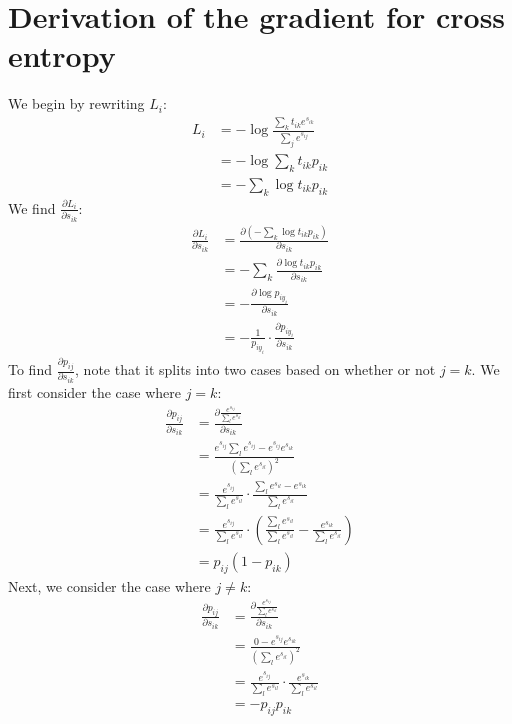 \documentclass[11pt]{article}
\begin{document}


\section*{Derivation of the gradient for cross entropy}
We begin by rewriting $L_i$:
\begin{align*}
	L_i&=-\log\frac{\sum_kt_{ik}e^{s_{ik}}}{\sum_je^{s_{ij}}}\\
	   &=-\log\sum_kt_{ik}p_{ik}\\
	   &=-\sum_k\log t_{ik}p_{ik}
\end{align*}
We find $\frac{\partial L_i}{\partial s_{ik}}$:
\begin{align*}
	\frac{\partial L_i}{\partial s_{ik}}
	&=\frac{\partial(-\sum_k\log t_{ik}p_{ik})}{\partial s_{ik}}\\
	&=-\sum_k\frac{\partial\log t_{ik}p_{ik}}{\partial s_{ik}}\\
	&=-\frac{\partial \log{p_{iy_i}}}{\partial s_{ik}}\\
	&=-\frac{1}{p_{iy_i}}\cdot\frac{\partial p_{iy_i}}{\partial s_{ik}}
\end{align*}
To find $\frac{\partial p_{ij}}{\partial s_{ik}}$, note that it splits into two cases based on whether or not $j=k$.
We first consider the case where $j=k$:
\begin{align*}
	\frac{\partial p_{ij}}{\partial s_{ik}}
	&=\frac{\partial \frac{e^{s_{ij}}}{\sum_l e^{s_{il}}}}{\partial s_{ik}}\\
	&=\frac{e^{s_{ij}}\sum_l e^{s_{ij}}-e^{s_{ij}}e^{s_{ik}}}{\left(\sum_l e^{s_{il}}\right)^2}\\
	&=\frac{e^{s_{ij}}}{\sum_l e^{s_{il}}}\cdot\frac{\sum_l e^{s_{il}}-e^{s_{ik}}}{\sum_l e^{s_{il}}}\\
	&=\frac{e^{s_{ij}}}{\sum_l e^{s_{il}}}\cdot\left(\frac{\sum_l e^{s_{il}}}{\sum_l e^{s_{il}}}-\frac{e^{s_{ik}}}{\sum_l e^{s_{il}}}\right)\\
	&=p_{ij}\left(1-p_{ik}\right)
\end{align*}
Next, we consider the case where $j\neq k$:
\begin{align*}
	\frac{\partial p_{ij}}{\partial s_{ik}}
	&=\frac{\partial \frac{e^{s_{ij}}}{\sum_l e^{s_{il}}}}{\partial s_{ik}}\\
	&=\frac{0-e^{s_{ij}}e^{s_{ik}}}{\left(\sum_l e^{s_{il}}\right)^2}\\
	&=\frac{e^{s_{ij}}}{\sum_l e^{s_{il}}}\cdot\frac{e^{s_{ik}}}{\sum_l e^{s_{il}}}\\
	&=-p_{ij}p_{ik}
\end{align*}
\end{document}
